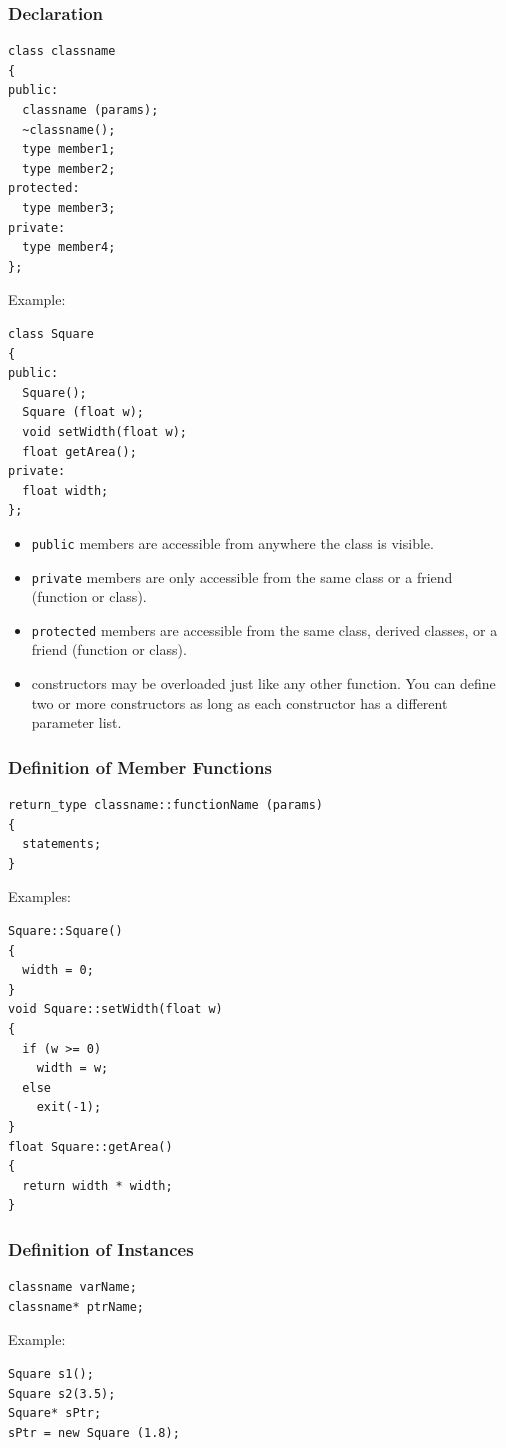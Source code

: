 \documentclass{article}
\begin{document}
\subsubsection*{Declaration}
\begin{verbatim}
class classname
{
public:
  classname (params);
  ~classname();
  type member1;
  type member2;
protected:
  type member3;
private:
  type member4;
};
\end{verbatim}
Example:
\begin{verbatim}
class Square
{
public:
  Square();
  Square (float w);
  void setWidth(float w);
  float getArea();
private:
  float width;
};
\end{verbatim}
\begin{itemize}
    \item \texttt{public} members are accessible from anywhere the class is visible.
    \item \texttt{private} members are only accessible from the same class or a friend (function or class).
    \item \texttt{protected} members are accessible from the same class, derived classes, or a friend (function or class).
    \item constructors may be overloaded just like any other function. You can define two or more constructors as long as each constructor has a different parameter list.
\end{itemize}

\subsubsection*{Definition of Member Functions}
\begin{verbatim}
return_type classname::functionName (params)
{
  statements;
}
\end{verbatim}
Examples:
\begin{verbatim}
Square::Square()
{
  width = 0;
}
void Square::setWidth(float w)
{
  if (w >= 0)
    width = w;
  else
    exit(-1);
}
float Square::getArea()
{
  return width * width;
}
\end{verbatim}

\subsubsection*{Definition of Instances}
\begin{verbatim}
classname varName;
classname* ptrName;
\end{verbatim}
Example:
\begin{verbatim}
Square s1();
Square s2(3.5);
Square* sPtr;
sPtr = new Square (1.8);
\end{verbatim}
\end{document}
